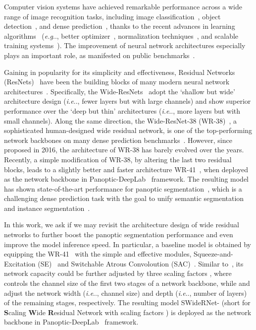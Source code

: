 \documentclass[final]{cvpr}
\makeatletter
\DeclareRobustCommand\onedot{\futurelet\@let@token\@onedot}
\def\@onedot{\ifx\@let@token.\else.\null\fi\xspace}
\def\eg{\emph{e.g}\onedot} \def\Eg{\emph{E.g}\onedot}
\def\ie{\emph{i.e}\onedot} \def\Ie{\emph{I.e}\onedot}
\makeatother
\begin{document}
Computer vision systems have achieved remarkable performance across a wide range of image recognition tasks, including image classification~\cite{krizhevsky2012imagenet,simonyan2014very}, object detection~\cite{girshick2014rich,ren2015faster}, and dense prediction~\cite{long2015fully,deeplabv12015}, thanks to the recent advances in  learning algorithms~\cite{goodfellow2016deep} (\eg, better optimizer~\cite{kingma2015adam}, normalization techniques~\cite{ioffe2015batch,salimans2016weight,wu2018group,qiao2019weight}, and scalable training systems~\cite{tensorflow-osdi2016,goyal2017accurate,peng2018megdet}). The improvement of neural network architectures especially plays an important role, as manifested on public benchmarks~\cite{everingham2010pascal,lin2014microsoft,ILSVRC15}. 

Gaining in popularity for its simplicity and effectiveness, Residual Networks (ResNets)~\cite{he2016deep} have been the building blocks of many modern neural network architectures~\cite{wrn2016wide,xie2017aggregated,hu2018squeeze,wu2019wider,li2019selective,gao2019res2net,radosavovic2020designing,zhang2020resnest}. Specifically, the Wide-ResNets~\cite{wrn2016wide} adopt the `shallow but wide' architecture design (\ie, fewer layers but with large channels) and show superior performance over the `deep but thin' architectures (\ie, more layers but with small channels). Along the same direction, the Wide-ResNet-38 (WR-38)~\cite{wu2019wider}, a sophisticated human-designed wide residual network, is one of the top-performing network backbones on many dense prediction benchmarks~\cite{cordts2016cityscapes,neuhold2017mapillary}.
However, since proposed in 2016, the architecture of WR-38 has barely evolved over the years.
Recently, a simple modification of WR-38, by altering the last two residual blocks, leads to a slightly better and faster architecture WR-41~\cite{chen2020naive}, when deployed as the network backbone in  Panoptic-DeepLab~\cite{cheng2019panoptic} framework. The resulting model has shown state-of-the-art performance for panoptic  segmentation~\cite{kirillov2018panoptic}, which is a challenging dense prediction task with the goal to unify semantic segmentation~\cite{he2004multiscale} and instance segmentation~\cite{hariharan2014simultaneous}. 

In this work, we ask if we may revisit the architecture design of wide residual networks to further boost the panoptic segmentation performance and even improve the model inference speed.
In particular, a baseline model is obtained by equipping the WR-41~\cite{chen2020naive} with the simple and effective modules, Squeeze-and-Excitation (SE)~\cite{hu2018squeeze} and Switchable Atrous Convoloution (SAC)~\cite{qiao2020detectors}. Similar to~\cite{wrn2016wide,howard2017mobilenets,tan2019efficientnet}, its network capacity could be further adjusted by three scaling factors , where  controls the channel size of the first two stages of a network backbone, while  and  adjust the network width (\ie, channel size) and depth (\ie, number of layers) of the remaining stages, respectively. The resulting model SWideRNet- (short for {\bf S}caling {\bf W}ide {\bf R}esidual Network with scaling factors ) is deployed as the network backbone in Panoptic-DeepLab~\cite{cheng2019panoptic} framework.
\end{document}

